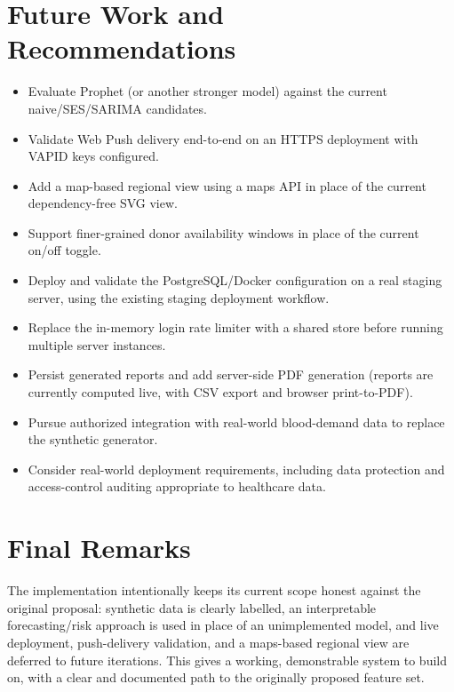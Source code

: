\documentclass[12pt,a4paper,twoside]{report}
\begin{document}
\section{Future Work and Recommendations}
\begin{itemize}
\item Evaluate Prophet (or another stronger model) against the current naive/SES/SARIMA candidates.
\item Validate Web Push delivery end-to-end on an HTTPS deployment with VAPID keys configured.
\item Add a map-based regional view using a maps API in place of the current dependency-free SVG view.
\item Support finer-grained donor availability windows in place of the current on/off toggle.
\item Deploy and validate the PostgreSQL/Docker configuration on a real staging server, using the existing staging deployment workflow.
\item Replace the in-memory login rate limiter with a shared store before running multiple server instances.
\item Persist generated reports and add server-side PDF generation (reports are currently computed live, with CSV export and browser print-to-PDF).
\item Pursue authorized integration with real-world blood-demand data to replace the synthetic generator.
\item Consider real-world deployment requirements, including data protection and access-control auditing appropriate to healthcare data.
\end{itemize}

\section{Final Remarks}
The implementation intentionally keeps its current scope honest against the original proposal: synthetic data is clearly labelled, an interpretable forecasting/risk approach is used in place of an unimplemented model, and live deployment, push-delivery validation, and a maps-based regional view are deferred to future iterations. This gives a working, demonstrable system to build on, with a clear and documented path to the originally proposed feature set.
\end{document}
